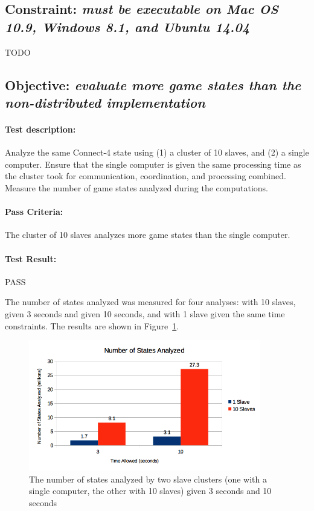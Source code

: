 \documentclass[pdftex,12pt,a4paper]{article}
\begin{document}

\subsection{\textbf{Constraint:} \emph{must be executable on Mac OS 10.9, Windows 8.1, and Ubuntu 14.04}}

TODO


\subsection{\textbf{Objective:} \emph{evaluate more game states than the non-distributed implementation}}

\paragraph{Test description:} Analyze the same Connect-4 state using (1) a cluster of 10 slaves, and (2) a single computer. Ensure that the single computer is given the same processing time as the cluster took for communication, coordination, and processing combined. Measure the number of game states analyzed during the computations.

\paragraph{Pass Criteria:} The cluster of 10 slaves analyzes more game states than the single computer.

\paragraph{Test Result:} PASS

The number of states analyzed was measured for four analyses: with 10 slaves, given 3 seconds and given 10 seconds, and with 1 slave given the same time constraints. The results are shown in Figure~\ref{fig:number-analyzed}.

\begin{figure}[h]
\begin{center}
\includegraphics[width=0.9\textwidth]{img/number-analyzed}
\caption{The number of states analyzed by two slave clusters (one with a single computer, the other with 10 slaves) given 3 seconds and 10 seconds}
\label{fig:number-analyzed}
\end{center}
\end{figure}
\end{document}
